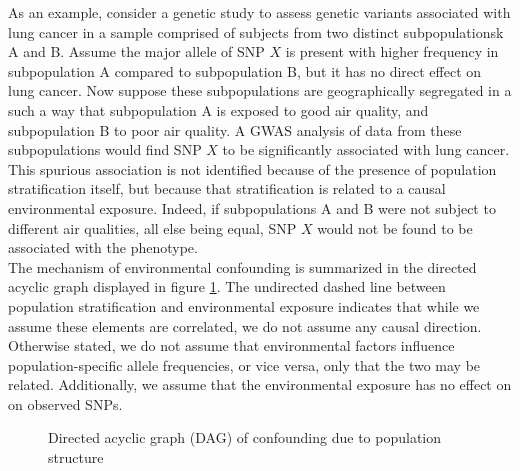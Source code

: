 As an example, consider a genetic study to assess genetic variants associated with lung cancer in a sample comprised of subjects from two distinct subpopulationsk A and B. Assume the major allele of SNP $X$ is present with higher frequency in subpopulation A compared to subpopulation B, but it has no direct effect on lung cancer. Now suppose these subpopulations are geographically segregated in a such a way that subpopulation A is exposed to good air quality, and subpopulation B to poor air quality. A GWAS analysis of data from these subpopulations would find SNP $X$ to be significantly associated with lung cancer. This spurious association is not identified because of the presence of population stratification itself, but because that stratification is related to a causal environmental exposure. Indeed, if subpopulations A and B were not subject to different air qualities, all else being equal, SNP $X$ would not be found to be associated with the phenotype.\\


The mechanism of environmental confounding is summarized in the directed acyclic graph displayed in figure \ref{fig:ps_env}. The undirected dashed line between population stratification and environmental exposure indicates that while we assume these elements are correlated, we do not assume any causal direction. Otherwise stated, we do not assume that environmental factors influence population-specific allele frequencies, or vice versa, only that the two may be related. Additionally, we assume that the environmental exposure has no effect on on observed SNPs.

\begin{figure}[H]
\centering
{}
\caption{Directed acyclic graph (DAG) of confounding due to population structure}
\label{fig:ps_env}
\end{figure}

